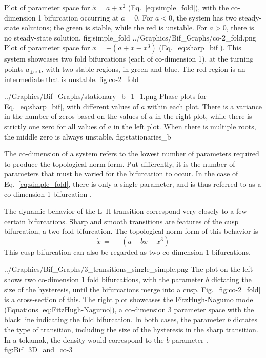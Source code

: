 	{Plot of parameter space for $\dot{x} = a + x^2$ (Eq.~\ref{eq:simple_fold}), with the co-dimension 1 bifurcation occurring at $a = 0$. %
	For $a < 0$, the system has two steady-state solutions; the green is stable, while the red is unstable.
	For $a > 0$, there is no steady-state solution.}
	{fig:simple_fold}
	{../Graphics/Bif_Graphs/co-2_fold.png}
	{Plot of parameter space for $\dot{x} = -(a + x - x^3)$ (Eq.~\ref{eq:sharp_bif}). %
	This system showcases two fold bifurcations (each of co-dimension 1), at the turning points $a_{\pm\text{crit}}$, with two stable regions, in green and blue. %
	The red region is an intermediate that is unstable.}
	{fig:co-2_fold}

	{../Graphics/Bif_Graphs/stationary_b_1_1.png}
	{Phase plots for Eq.~\ref{eq:sharp_bif}, with different values of $a$ within each plot. %
	There is a variance in the number of zeros based on the values of $a$ in the right plot, while there is strictly one zero for all values of $a$ in the left plot. %
	When there is multiple roots, the middle zero is always unstable.}
	{fig:stationaries_b}

The co-dimension of a system refers to the lowest number of parameters required to produce the topological norm form.
Put differently, it is the number of parameters that must be varied for the bifurcation to occur.
In the case of Eq.~\ref{eq:simple_fold}, there is only a single parameter, and is thus referred to as a co-dimension 1 bifurcation \cite{weymiens_bifurcation_2014}.

\todo{\color{red}{FIX HERE!}}
The dynamic behavior of the L--H transition correspond very closely to a few certain bifurcations.
Sharp and smooth transitions are features of the cusp bifurcation, a two-fold bifurcation.
The topological norm form of this behavior is
\begin{equation}
	\dot{x} \,=\, -(a + bx - x^3)
	\label{eq:sharp_bif}
\end{equation}
This cusp bifurcation can also be regarded as two co-dimension 1 bifurcations.

	{../Graphics/Bif_Graphs/3_transitions_single_simple.png}
	{The plot on the left shows two co-dimension 1 fold bifurcations, with the parameter $b$ dictating the size of the hysteresis, until the bifurcations merge into a cusp.
	Fig.~\ref{fig:co-2_fold} is a cross-section of this.
	The right plot showcases the FitzHugh-Nagumo model (Equations \ref{eq:FitzHugh-Nagumo}), a co-dimension 3 parameter space with the black line indicating the fold bifurcation.
	In both cases, the parameter $b$ dictates the type of transition, including the size of the hysteresis in the sharp transition.
	In a tokamak, the density would correspond to the $b$-parameter \cite{weymiens_bifurcation_2014}.}
	{fig:Bif_3D_and_co-3}

